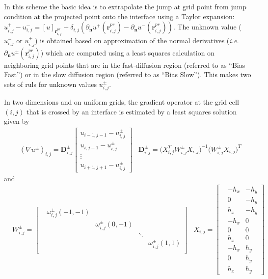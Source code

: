 \documentclass{elsarticle}
\begin{document}
In this scheme the basic idea is to extrapolate the jump at grid point from jump condition at the projected point onto the interface using a Taylor expansion: $u^+_{i,j} - u^-_{i,j}=[u]_{\mathbf{r}_{i,j}^{pr}} + \delta_{i,j}(\partial_\mathbf{n}u^+(\mathbf{r}^{pr}_{i,j}) - \partial_\mathbf{n}u^-(\mathbf{r}^{pr}_{i,j})) $. The unknown value ($u^-_{i,j}$ or $u^+_{i,j}$) is obtained based on approximation of the normal derivatives (\textit{i.e.} $\partial_\mathbf{n}u^\pm(\mathbf{r}^{pr}_{i,j})$) which are computed using a least squares calculation on neighboring grid points that are in the fast-diffusion region (referred to as ``Bias Fast'') or in the slow diffusion region (referred to as ``Bias Slow''). This makes two sets of ruls for unknown values $u^\pm_{i,j}$.

In two dimensions and on uniform grids, the gradient operator at the grid cell $(i,j)$ that is crossed by an interface is estimated by a least squares solution given by
\begin{align*}
	 & (\nabla u^\pm)_{i,j} = \mathbf{D}^\pm_{i,j} \begin{bmatrix}
		u_{i-1,j-1} - u^\pm_{i,j} \\
		u_{i,j-1} - u^\pm_{i,j}   \\
		\vdots                    \\
		u_{i+1,j+1} - u^\pm_{i,j}
	\end{bmatrix} & \mathbf{D}^\pm_{i,j} = \big(X^T_{i,j} W^\pm_{i,j} X_{i,j} \big)^{-1} \big( W^\pm_{i,j} X_{i,j} \big)^T
\end{align*}
and
\begin{align*}
	 & W^\pm_{i,j} = \begin{bmatrix}
		 & \omega^\pm_{i,j} (-1,-1) &                         &        &                        \\
		 &                          & \omega^\pm_{i,j} (0,-1) &        &                        \\
		 &                          &                         & \ddots &                        \\
		 &                          &                         &        & \omega^\pm_{i,j} (1,1) \\
	\end{bmatrix} & X_{i,j} = \begin{bmatrix}
		 & -h_x & -h_y \\
		 & 0    & -h_y \\
		 & h_x  & -h_y \\
		 & -h_x & 0    \\
		 & 0    & 0    \\
		 & h_x  & 0    \\
		 & -h_x & h_y  \\
		 & 0    & h_y  \\
		 & h_x  & h_y
	\end{bmatrix}
\end{align*}
\end{document}
